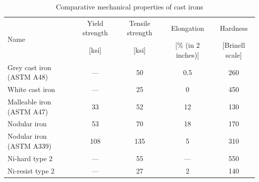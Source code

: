 \documentclass[
10pt,
a4paper,
openany,
svgnames,
]{book}
\begin{document}
\begin{table}[H]
  \centering
  \begin{tabular}{lcccc}
    \toprule
    \multirow{2}{2cm}{Name} & Yield strength & Tensile strength & Elongation & Hardness \\
                            & {[}ksi{]} & {[}ksi{]} & {[}\% (in 2 inches){]} & {[}Brinell scale{]} \\
    \midrule
    Grey cast iron (ASTM A48) & — & 50 & 0.5 & 260 \\
    White cast iron & — & 25 & 0 & 450 \\
    Malleable iron (ASTM A47) & 33 & 52 & 12 & 130 \\
    Nodular iron & 53 & 70 & 18 & 170 \\
    Nodular iron (ASTM A339) & 108 & 135 & 5 & 310 \\
    Ni-hard type 2 & — & 55 & — & 550 \\
    Ni-resist type 2 & — & 27 & 2 & 140 \\
    \bottomrule
  \end{tabular}
  \caption{Comparative mechanical properties of cast irons \cite{plisga2017standard}}
  \label{tab: cast iron props}
\end{table}
\end{document}
